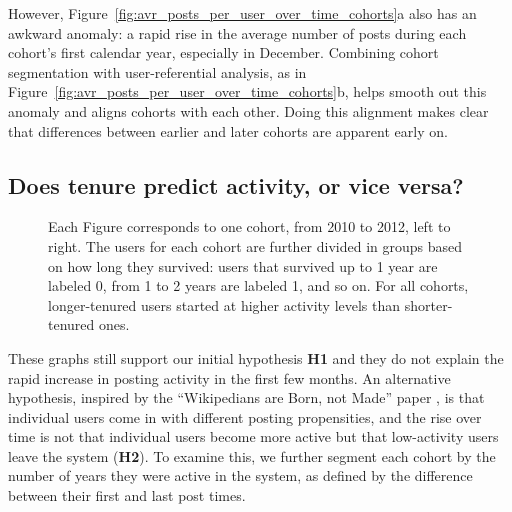 However, Figure~\ref{fig:avr_posts_per_user_over_time_cohorts}a also has an awkward anomaly: a rapid rise in the average number of posts during each cohort's first calendar year, especially in December. Combining cohort segmentation with user-referential analysis, as in Figure~\ref{fig:avr_posts_per_user_over_time_cohorts}b, helps smooth out this anomaly and aligns cohorts with each other.  Doing this alignment makes clear that differences between earlier and later cohorts are apparent early on.

\subsection{Does tenure predict activity, or vice versa?}

\begin{figure*}[!tb]
\centering
{}
\caption{Each Figure corresponds to one cohort, from 2010 to 2012, left to right. The users for each cohort are further divided in groups based on how long they survived: users that survived up to 1 year are labeled 0, from 1 to 2 years are labeled 1, and so on.  For all cohorts, longer-tenured users started at higher activity levels than shorter-tenured ones.}
\label{fig:avr_posts_per_user_for_surviving_year}
\end{figure*}

These graphs still support our initial hypothesis \textbf{H1} 
and they do not explain the rapid increase in posting activity in the first few months.  An alternative hypothesis, inspired by the ``Wikipedians are Born, not Made'' paper \cite{Panciera2009}, is that individual users come in with different posting propensities, and the rise over time is not that individual users become more active but that low-activity users leave the system (\textbf{H2}).  To examine this, we further segment each cohort by the number of years they were active in the system, as defined by the difference between their first and last post times.
 

